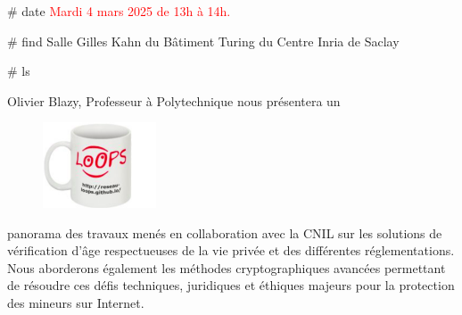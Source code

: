 \documentclass[final]{beamer}
\newlength{\twocolwid}
\begin{document}
\begin{frame}[t]
\begin{columns}[t]
\begin{column}{\twocolwid}
\begin{block}{\# date}
				{\textcolor{red}{
				 Mardi 4 mars 2025 de 13h \`{a} 14h.
				}}

			\end{block}


			\begin{block}{\# find}
				 Salle Gilles Kahn du B\^{a}timent Turing du Centre Inria de Saclay
			\end{block}

			\begin{block}{\# ls}


				 Olivier Blazy, Professeur à Polytechnique nous pr\'{e}sentera un

				\begin{figure}
					\centering
					\includegraphics[width=0.3\textwidth]{tasse_b.png}
				\end{figure}

				panorama des travaux men\'{e}s en collaboration avec la CNIL sur les solutions de
				v\'{e}rification d'\^{a}ge respectueuses de la vie priv\'{e}e et des diff\'{e}rentes
				r\'{e}glementations.
				Nous aborderons \'{e}galement les m\'{e}thodes cryptographiques avanc\'{e}es permettant de
				r\'{e}soudre ces d\'{e}fis techniques, juridiques et \'{e}thiques majeurs pour
				la protection des mineurs sur Internet.

				\vspace{-0.5in}

			\end{block}







\end{column}
\end{columns}
\end{frame}
\end{document}
